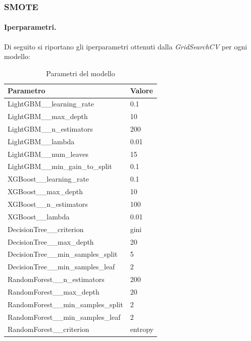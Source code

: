 \subsubsection{SMOTE}
\paragraph{Iperparametri.} Di seguito si riportano gli iperparametri ottenuti dalla \textit{GridSearchCV} per ogni modello:

\begin{table}[H]
    \centering
    \begin{tabular}{|l|l|}
    \toprule
    \textbf{Parametro}                 & \textbf{Valore} \\ \midrule
    LightGBM\_\_learning\_rate            & 0.1             \\ 
    LightGBM\_\_max\_depth                & 10              \\ 
    LightGBM\_\_n\_estimators             & 200             \\ 
    LightGBM\_\_lambda                    & 0.01            \\ 
    LightGBM\_\_num\_leaves               & 15              \\ 
    LightGBM\_\_min\_gain\_to\_split      & 0.1             \\ 
    XGBoost\_\_learning\_rate         & 0.1             \\ 
    XGBoost\_\_max\_depth             & 10              \\ 
    XGBoost\_\_n\_estimators          & 100             \\ 
    XGBoost\_\_lambda                 & 0.01            \\ 
    DecisionTree\_\_criterion         & gini            \\ 
    DecisionTree\_\_max\_depth        & 20              \\ 
    DecisionTree\_\_min\_samples\_split & 5               \\ 
    DecisionTree\_\_min\_samples\_leaf & 2               \\ 
    RandomForest\_\_n\_estimators     & 200             \\ 
    RandomForest\_\_max\_depth        & 20              \\ 
    RandomForest\_\_min\_samples\_split & 2               \\ 
    RandomForest\_\_min\_samples\_leaf & 2               \\ 
    RandomForest\_\_criterion         & entropy         \\ \bottomrule
    \end{tabular}
    \caption{Parametri del modello}
    \end{table}

